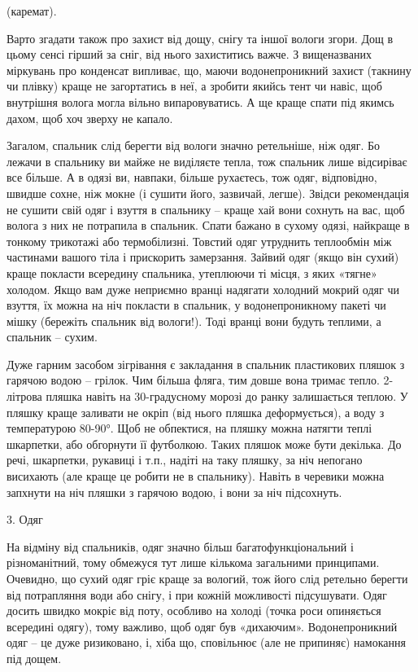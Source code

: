 (каремат).

Варто згадати також про захист від дощу, снігу та іншої вологи згори. Дощ в
цьому сенсі гірший за сніг, від нього захиститись важче. З вищеназваних
міркувань про конденсат випливає, що, маючи водонепроникний захист (такнину чи
плівку) краще не загортатись в неї, а зробити якийсь тент чи навіс, щоб
внутрішня волога могла вільно випаровуватись. А ще краще спати під якимсь
дахом, щоб хоч зверху не капало.

Загалом, спальник слід берегти від вологи значно ретельніше, ніж одяг. Бо
лежачи в спальнику ви майже не виділяєте тепла, тож спальник лише відсиріває
все більше. А в одязі ви, навпаки, більше рухаєтесь, тож одяг, відповідно,
швидше сохне, ніж мокне (і сушити його, зазвичай, легше). Звідси рекомендація
не сушити свій одяг і взуття в спальнику – краще хай вони сохнуть на вас, щоб
волога з них не потрапила в спальник. Спати бажано в сухому одязі, найкраще в
тонкому трикотажі або термобілизні. Товстий одяг утруднить теплообмін між
частинами вашого тіла і прискорить замерзання. Зайвий одяг (якщо він сухий)
краще покласти всередину спальника, утеплюючи ті місця, з яких «тягне» холодом.
Якщо вам дуже неприємно вранці надягати холодний мокрий одяг чи взуття, їх
можна на ніч покласти в спальник, у водонепроникному пакеті чи мішку (бережіть
спальник від вологи!). Тоді вранці вони будуть теплими, а спальник – сухим.

Дуже гарним засобом зігрівання є закладання в спальник пластикових пляшок з
гарячою водою – грілок. Чим більша фляга, тим довше вона тримає тепло.
2-літрова пляшка навіть на 30-градусному морозі до ранку залишається теплою. У
пляшку краще заливати не окріп (від нього пляшка деформується), а воду з
температурою 80-90°. Щоб не обпектися, на пляшку можна натягти теплі шкарпетки,
або обгорнути її футболкою. Таких пляшок може бути декілька. До речі,
шкарпетки, рукавиці і т.п., надіті на таку пляшку, за ніч непогано висихають
(але краще це робити не в спальнику). Навіть в черевики можна запхнути на ніч
пляшки з гарячою водою, і вони за ніч підсохнуть.

3. Одяг

На відміну від спальників, одяг значно більш багатофункціональний і
різноманітний, тому обмежуся тут лише кількома загальними принципами. Очевидно,
що сухий одяг гріє краще за вологий, тож його слід ретельно берегти від
потрапляння води або снігу, і при кожній можливості підсушувати. Одяг досить
швидко мокріє від поту, особливо на холоді (точка роси опиняється всередині
одягу), тому важливо, щоб одяг був «дихаючим». Водонепроникний одяг – це дуже
ризиковано, і, хіба що, сповільнює (але не припиняє) намокання під дощем. 

